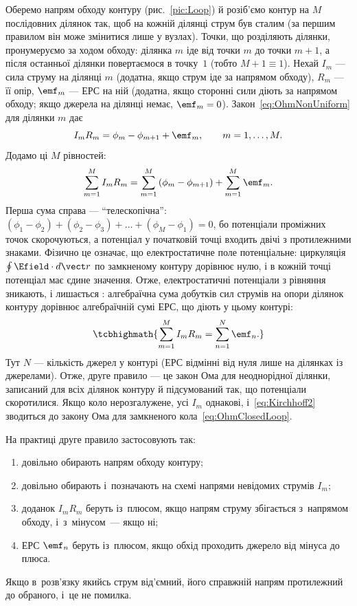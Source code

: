 Оберемо напрям обходу контуру (рис.~\ref{pic:Loop}) й розіб'ємо контур на $M$ послідовних ділянок так, щоб на кожній ділянці струм був сталим (за першим
правилом він може змінитися лише у вузлах). Точки, що розділяють ділянки, пронумеруємо за ходом обходу: ділянка $m$ іде від точки $m$ до точки
$m+1$, а після останньої ділянки повертаємося в точку~$1$ (тобто $M+1\equiv 1$). Нехай $I_m$ --- сила струму на ділянці $m$ (додатна, якщо струм
іде за напрямом обходу), $R_m$ --- її опір, $\emf_m$ --- ЕРС на ній (додатна, якщо сторонні сили діють за напрямом обходу; якщо джерела на
ділянці немає, $\emf_m = 0$). Закон~\eqref{eq:OhmNonUniform} для ділянки $m$ дає
\begin{equation*}
	I_m R_m = \phi_m - \phi_{m+1} + \emf_m, \qquad m = 1,\dots,M.
\end{equation*}
Додамо ці $M$ рівностей:
\begin{equation*}
	\sum\limits_{m=1}^M I_m R_m = \sum\limits_{m=1}^M \left(\phi_m - \phi_{m+1}\right) + \sum\limits_{m=1}^M \emf_m.
\end{equation*}
Перша сума справа --- \enquote{телескопічна}: $(\phi_1-\phi_2)+(\phi_2-\phi_3)+\dots+(\phi_M-\phi_1)=0$, бо потенціали проміжних точок
скорочуються, а потенціал у початковій точці входить двічі з протилежними знаками. Фізично це означає, що електростатичне поле потенціальне:
циркуляція $\oint \Efield\cdot d\vect r$ по замкненому контуру дорівнює нулю, і в кожній точці потенціал має єдине значення. Отже, електростатичні
потенціали з рівняння зникають, і лишається : алгебраїчна сума добутків сил струмів на опори ділянок контуру дорівнює
алгебраїчній сумі ЕРС, що діють у цьому контурі:
\begin{equation}\label{eq:Kirchhoff2}
	\tcbhighmath{
		\sum\limits_{m=1}^M I_m R_m = \sum\limits_{n=1}^N \emf_n.
	}
\end{equation}
Тут $N$ --- кількість джерел у контурі (ЕРС відмінні від нуля лише на ділянках із джерелами). Отже, друге правило --- це закон Ома для
неоднорідної ділянки, записаний для всіх ділянок контуру й підсумований так, що потенціали скоротилися. Якщо коло нерозгалужене, усі $I_m$
однакові, і~\eqref{eq:Kirchhoff2} зводиться до закону Ома для замкненого кола~\eqref{eq:OhmClosedLoop}.

На практиці друге правило застосовують так:
\begin{enumerate}
	\item довільно обирають напрям обходу контуру;
	\item довільно обирають і~позначають на схемі напрями невідомих струмів $I_m$;
	\item доданок $I_mR_m$ беруть із~плюсом, якщо напрям струму збігається з~напрямом обходу,
	      і~з~мінусом~--- якщо ні;
	\item ЕРС $\emf_n$ беруть із~плюсом, якщо обхід проходить джерело від мінуса до плюса.
\end{enumerate}
Якщо в~розв'язку якийсь струм від'ємний, його справжній напрям протилежний до обраного,
і~це не помилка.

